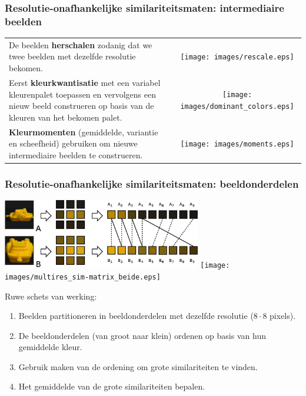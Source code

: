 \documentclass[dutch]{beamer}
\theoremstyle{definition}
\theoremstyle{remark}
\theoremstyle{example}
\begin{document}
{
  \frametitle{Resolutie-onafhankelijke similariteitsmaten: intermediaire beelden}

  \begin{center}
  \begin{tabular}{@{}lc@{}}
  \begin{minipage}{0.6\textwidth}
  De beelden \textbf{herschalen} zodanig dat we twee beelden met dezelfde resolutie bekomen. 
  \end{minipage} & 
  \begin{minipage}{0.4\textwidth}
  \texttt{[image: images/rescale.eps]}
  \end{minipage}\vspace{5pt}\\
  \begin{minipage}{0.6\textwidth}
  Eerst \textbf{kleurkwantisatie} met een variabel kleurenpalet toepassen en vervolgens een
  nieuw beeld construeren op basis van de kleuren van het bekomen palet.
  \end{minipage} &
  \begin{minipage}{0.4\textwidth}
  \texttt{[image: images/dominant\_colors.eps]}
  \end{minipage}\vspace{5pt}\\
  \begin{minipage}{0.6\textwidth}
  \textbf{Kleurmomenten} (gemiddelde, variantie en scheefheid) gebruiken om nieuwe 
  intermediaire beelden te construeren.
  \end{minipage} &
  \begin{minipage}{0.4\textwidth}
  \texttt{[image: images/moments.eps]}
  \end{minipage}
  \end{tabular}
  \end{center}
}
\frame
{
  \frametitle{Resolutie-onafhankelijke similariteitsmaten: beeldonderdelen}
  
  \begin{minipage}{\textwidth}
  \centering
  \includegraphics[width=0.65\textwidth]{images/multires.eps}\qquad
  \texttt{[image: images/multires\_sim-matrix\_beide.eps]}
  \vspace{4pt}
  \end{minipage}
  Ruwe schets van werking:
  \begin{enumerate}
    \item Beelden partitioneren in beeldonderdelen met dezelfde resolutie 
    ($8 \cdot 8$ pixels).
    \item De beeldonderdelen (van groot naar klein) ordenen op basis van
    hun gemiddelde kleur.
    \item Gebruik maken van de ordening om grote similariteiten te vinden.
    \item Het gemiddelde van de grote similariteiten bepalen.
  \end{enumerate}
}
\end{document}
